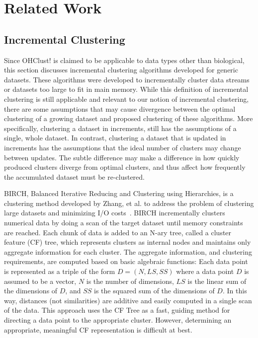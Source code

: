 \documentclass[12pt]{ucthesis}
\begin{document}
\chapter{Related Work}\label{chap:related}
   \section{Incremental Clustering}\label{sec:incr_cluster}
   Since \textsf{OHClust!} is claimed to be applicable to data types other than
   biological, this section discusses incremental clustering algorithms
   developed for generic datasets. These algorithms were developed to
   incrementally cluster data streams or datasets too large to fit in main
   memory. While this definition of incremental clustering is still applicable
   and relevant to our notion of incremental clustering, there are some
   assumptions that may cause divergence between the optimal clustering of a
   growing dataset and proposed clustering of these algorithms. More
   specifically, clustering a dataset in increments, still has the assumptions
   of a single, whole dataset. In contrast, clustering a dataset that is
   updated in increments has the assumptions that the ideal number of clusters
   may change between updates. The subtle difference may make a difference in
   how quickly produced clusters diverge from optimal clusters, and thus affect
   how frequently the accumulated dataset must be re-clustered.

   BIRCH, Balanced Iterative Reducing and Clustering using Hierarchies, is a
   clustering method developed by Zhang, et al. to address the problem of
   clustering large datasets and minimizing I/O costs~\cite{Zhang:BIRCH}. BIRCH
   incrementally clusters numerical data by doing a scan of the target dataset
   until memory constraints are reached. Each chunk of data is added to an
   N-ary tree, called a cluster feature (CF) tree, which represents clusters as
   internal nodes and maintains only aggregate information for each cluster.
   The aggregate information, and clustering requirements, are computed based
   on basic algebraic functions: Each data point is represented as a triple of
   the form $D = (N, LS, SS)$ where a data point $D$ is assumed to be a vector,
   $N$ is the number of dimensions, $LS$ is the linear sum of the dimensions of
   $D$, and $SS$ is the squared sum of the dimensions of $D$. In this way,
   distances (not similarities) are additive and easily computed in a single
   scan of the data. This approach uses the CF Tree as a fast, guiding method
   for directing a data point to the appropriate cluster. However, determining
   an appropriate, meaningful CF representation is difficult at best.
\end{document}
